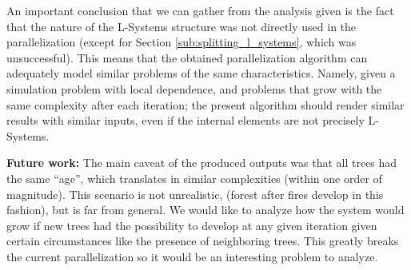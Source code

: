 \documentclass[letterpaper,twoside,11pt]{article}
\begin{document}
\begin{multicols}{2}
An important conclusion that we can gather from the analysis given is the fact that the nature of the L-Systems structure was not directly used in the parallelization (except for Section \ref{sub:splitting_l_systems}, which was unsuccessful). This means that the obtained parallelization algorithm can adequately model similar problems of the same characteristics. Namely, given a simulation problem with local dependence, and problems that grow with the same complexity after each iteration; the present algorithm should render similar results with similar inputs, even if the internal elements are not precisely L-Systems.

\textbf{Future work:} The main caveat of the produced outputs was that all trees had the same ``age'', which translates in similar complexities (within one order of magnitude). This scenario is not unrealistic, (forest after fires develop in this fashion), but is far from general. We would like to analyze how the system would grow if new trees had the possibility to develop at any given iteration given certain circumstances like the presence of neighboring trees. This greatly breaks the current parallelization so it would be an interesting problem to analyze.



\nocite{*}



 


\end{multicols}
\end{document}
